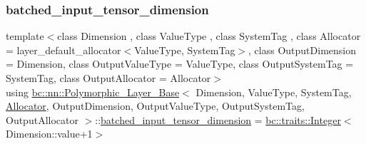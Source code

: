 \subsubsection{\texorpdfstring{batched\+\_\+input\+\_\+tensor\+\_\+dimension}{batched\_input\_tensor\_dimension}\hspace{0.1cm}{\footnotesize\ttfamily [2/2]}}
{\footnotesize\ttfamily template$<$class Dimension , class Value\+Type , class System\+Tag , class Allocator  = layer\+\_\+default\+\_\+allocator$<$\+Value\+Type, System\+Tag$>$, class Output\+Dimension  = Dimension, class Output\+Value\+Type  = Value\+Type, class Output\+System\+Tag  = System\+Tag, class Output\+Allocator  = Allocator$>$ \\
using \hyperlink{structbc_1_1nn_1_1Polymorphic__Layer__Base}{bc\+::nn\+::\+Polymorphic\+\_\+\+Layer\+\_\+\+Base}$<$ Dimension, Value\+Type, System\+Tag, \hyperlink{classbc_1_1allocators_1_1Allocator}{Allocator}, Output\+Dimension, Output\+Value\+Type, Output\+System\+Tag, Output\+Allocator $>$\+::\hyperlink{structbc_1_1nn_1_1Polymorphic__Layer__Base_a5ad2ab7a9e1bef167adba39b581bdeac}{batched\+\_\+input\+\_\+tensor\+\_\+dimension} =  \hyperlink{structbc_1_1traits_1_1Integer}{bc\+::traits\+::\+Integer}$<$Dimension\+::value+1$>$}

\mbox{\label{structbc_1_1nn_1_1Polymorphic__Layer__Base_ae694b03dd73923ff973b0d2c9156e161}} 
